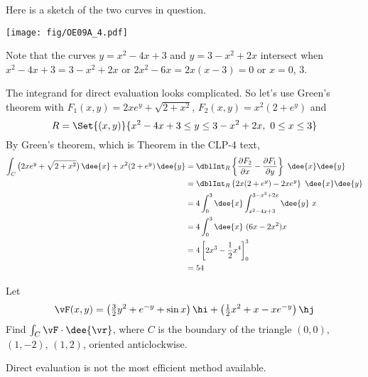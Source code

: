 \begin{solution}
Here is a sketch of the two curves in question.

\begin{center}
       \texttt{[image: fig/OE09A\_4.pdf]}
\end{center}

Note that the curves $y = x^2 - 4x+3$ and $y = 3 - x^2 + 2x$
intersect when $x^2 - 4x+3 = 3 - x^2 + 2x$ or $2x^2-6x=2x(x-3)=0$ or
$x=0$, $3$.

The integrand for direct evaluation looks complicated. So
let's use Green's theorem with
$F_1(x,y) = 2xe^y + \sqrt{2 + x^2}$, $F_2(x,y)= x^2 (2 + e^y)$
and
\begin{equation*}
R=\Set{(x,y)}{x^2 - 4x+3 \le y\le 3 - x^2 + 2x,\ 0\le x\le 3}
\end{equation*}
By Green's theorem, which is Theorem 
in the CLP-4 text,
\begin{align*}
\int_C \big(2xe^y + \sqrt{2 + x^2}\big)\, \dee{x}
            + x^2 (2 + e^y)\, \dee{y}
&=\dblInt_R\left\{\frac{\partial F_2}{\partial x}
                 -\frac{\partial F_1}{\partial y}\right\}\ \dee{x}\dee{y} \\
&=\dblInt_R\left\{2x(2+e^y) - 2xe^y\right\}\ \dee{x}\dee{y} \\
&=4 \int_0^3\dee{x} \int_{x^2 - 4x+3}^{3 - x^2 + 2x}\dee{y}\ x \\
&=4 \int_0^3\dee{x}\ (6x-2x^2) x \\
&=4\left[2x^3-\frac{1}{2}x^4\right]_0^3 \\
&=54
\end{align*}


\end{solution}


\begin{question}[M317 2006A] %
Let
\begin{align*}
\vF(x,y) = \big(\tfrac{3}{2}y^2 + e^{-y} +\sin x\big)\,\hi
           +\big(\tfrac{1}{2}x^2+x-x e^{-y}\big)\,\hj
\end{align*}
Find $\int_C\vF\cdot\dee{\vr}$, where $C$ is the boundary of the triangle
$(0,0)$, $(1,-2)$, $(1,2)$, oriented anticlockwise.

\end{question}

\begin{hint}
Direct evaluation is not the most efficient method available.
\end{hint}

